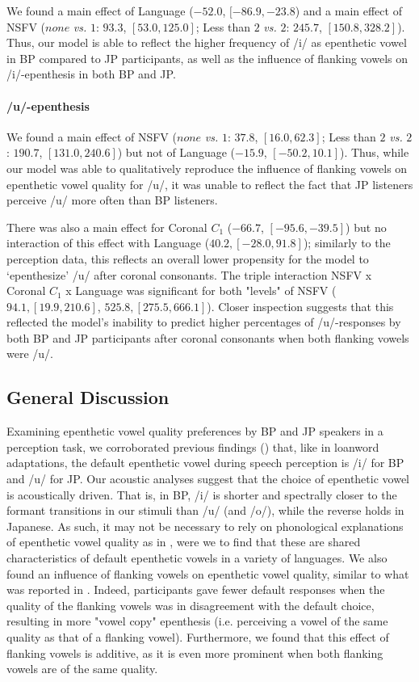 We found a main effect of Language ($-52.0$, $[-86.9, -23.8$) and a main effect of NSFV ($none$ \textit{vs.} $1$: $93.3$, $[53.0, 125.0]$; Less than $2$ \textit{vs.} $2$: $245.7$, $[150.8, 328.2]$). 
Thus, our model is able to reflect the higher frequency of /i/ as epenthetic vowel in BP compared to JP participants, as well as the influence of flanking vowels on /i/-epenthesis in both BP and JP. 

\paragraph{/u/-epenthesis}

We found a main effect of NSFV ($none$ \textit{vs.} $1$: $37.8$, $[16.0, 62.3]$; Less than $2$ \textit{vs.} $2$: $190.7$, $[131.0, 240.6]$) but not of Language ($-15.9$, $[-50.2, 10.1]$). Thus, while our model was able to qualitatively reproduce the influence of flanking vowels on epenthetic vowel quality for /u/, it was unable to reflect the fact that JP listeners perceive /u/ more often than BP listeners. 

There was also a main effect for Coronal $C_{1}$ ($-66.7$, $[-95.6, -39.5]$) but no interaction of this effect with Language ($40.2, [-28.0, 91.8]$); similarly to the perception data, this reflects an overall lower propensity for the model to `epenthesize' /u/ after coronal consonants. 
The triple interaction NSFV x Coronal $C_{1}$ x Language was significant for both "levels" of NSFV ($94.1, [19.9, 210.6]$, $525.8, [275.5, 666.1]$). Closer inspection suggests that this reflected the model's inability to predict higher percentages of /u/-responses by both BP and JP participants after coronal consonants when both flanking vowels were /u/. 

\subsection{General Discussion}

Examining epenthetic vowel quality preferences by BP and JP speakers in a perception task, we corroborated previous findings (\cite{dupoux_1999, dupoux_2011}) that, like in loanword adaptations, the default epenthetic vowel during speech perception is /i/ for BP and /u/ for JP. Our acoustic analyses suggest that the choice of epenthetic vowel is acoustically driven. That is, in BP, /i/ is shorter and spectrally closer to the formant transitions in our stimuli than /u/ (and /o/), while the reverse holds in Japanese. As such, it may not be necessary to rely on phonological explanations of epenthetic vowel quality as in \cite{rose2006, uffmann2006}, were we to find that these are shared characteristics of default epenthetic vowels in a variety of languages. We also found an influence of flanking vowels on epenthetic vowel quality, similar to what was reported in \cite{dupoux_2011}. Indeed, participants gave fewer default responses when the quality of the flanking vowels was in disagreement with the default choice, resulting in more "vowel copy" epenthesis (i.e. perceiving a vowel of the same quality as that of a flanking vowel). Furthermore, we found that this effect of flanking vowels is additive, as it is even more prominent when both flanking vowels are of the same quality.

